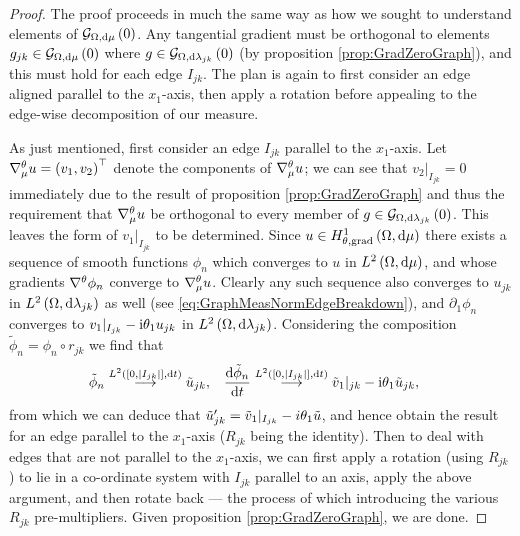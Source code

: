 \begin{proof}
	The proof proceeds in much the same way as how we sought to understand elements of $\mathcal{G}_{ \Omega, \mathrm{d}\mu}\left( 0 \right)$.
	Any tangential gradient must be orthogonal to elements $g_{jk}\in\mathcal{G}_{ \Omega, \mathrm{d}\mu}\left( 0 \right)$ where $g\in\mathcal{G}_{ \Omega, \mathrm{d}\lambda_{jk}}\left( 0 \right)$ (by proposition \ref{prop:GradZeroGraph}), and this must hold for each edge $I_{jk}$.
	The plan is again to first consider an edge aligned parallel to the $x_1$-axis, then apply a rotation before appealing to the edge-wise decomposition of our measure. \newline
	
	As just mentioned, first consider an edge $I_{jk}$ parallel to the $x_1$-axis. 
	Let $\nabla^{\theta}_\mu u = \left( v_1, v_2 \right)^\top$ denote the components of $\nabla^{\theta}_\mu u$; we can see that $v_2\vert_{I_{jk}}=0$ immediately due to the result of proposition \ref{prop:GradZeroGraph} and thus the requirement that $\nabla^{\theta}_\mu u$ be orthogonal to every member of $g\in\mathcal{G}_{ \Omega, \mathrm{d}\lambda_{jk}}\left( 0 \right)$.
	This leaves the form of $v_1\vert_{I_{jk}}$ to be determined.
	Since $u\in H^1_{\theta, \mathrm{grad}}\left( \Omega, \mathrm{d}\mu \right)$ there exists a sequence of smooth functions $\phi_n$ which converges to $u$ in $L^{2}\left( \Omega,\mathrm{d}\mu \right)$, and whose gradients $\nabla^{\theta}\phi_n$ converge to $\nabla^{\theta}_\mu u$.
	Clearly any such sequence also converges to $u_{jk}$ in $L^{2}\left( \Omega,\mathrm{d}\lambda_{jk} \right)$ as well (see \eqref{eq:GraphMeasNormEdgeBreakdown}), and $\partial_1\phi_n$ converges to $v_1\vert_{I_{jk}}-\mathrm{i}\theta_{1}u_{jk}$ in $L^{2}\left( \Omega,\mathrm{d}\lambda_{jk} \right)$.
	Considering the composition $\tilde{\phi}_n = \phi_n \circ r_{jk}$ we find that
	\begin{align*}
		\tilde{\phi}_n \overset{L^{2}\left( \left[ 0,\left\lvert I_{jk} \right\rvert \right],\mathrm{d}t \right)}{\longrightarrow} \tilde{u}_{jk},
		&\quad \dfrac{\mathrm{d}\tilde{\phi}_n}{\mathrm{d}t} \overset{L^{2}\left( \left[ 0,\left\lvert I_{jk} \right\rvert \right],\mathrm{d}t \right)}{\longrightarrow} \tilde{v}_1\vert_{jk} - \mathrm{i}\theta_1 \tilde{u}_{jk},
	\end{align*}
	from which we can deduce that $\tilde{u}_{jk}' = \tilde{v}_1\vert_{I_{jk}} - i\theta_1\tilde{u}$, and hence obtain the result for an edge parallel to the $x_1$-axis ($R_{jk}$ being the identity).
	Then to deal with edges that are not parallel to the $x_1$-axis, we can first apply a rotation (using $R_{jk}$) to lie in a co-ordinate system with $I_{jk}$ parallel to an axis, apply the above argument, and then rotate back --- the process of which introducing the various $R_{jk}$ pre-multipliers.
	Given proposition \ref{prop:GradZeroGraph}, we are done.
\end{proof}

